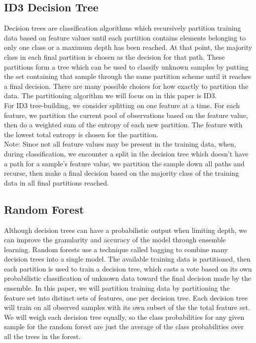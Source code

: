 \documentclass{amsart}
\theoremstyle{definition}
\theoremstyle{remark}
\numberwithin{equation}{section}
\begin{document}
\subsection{ID3 Decision Tree}
Decision trees are classification algorithms which recursively partition training data based on feature values until each partition contains elements belonging to only one class or a maximum depth has been reached. At that point, the majority class in each final partition is chosen as the decision for that path. These partitions form a tree which can be used to classify unknown samples by putting the set containing that sample through the same partition scheme until it reaches a final decision. There are many possible choices for how exactly to partition the data. The partitioning algorithm we will focus on in this paper is ID3.\\
For ID3 tree-building, we consider splitting on one feature at a time. For each feature, we partition the current pool of observations based on the feature value, then do a weighted sum of the entropy of each new partition. The feature with the lowest total entropy is chosen for the partition.\\
Note: Since not all feature values may be present in the training data, when, during classification, we encounter a split in the decision tree which doesn't have a path for a sample's feature value, we partition the sample down all paths and recurse, then make a final decision based on the majority class of the training data in all final partitions reached.\\
\subsection{Random Forest}
Although decision trees can have a probabilistic output when limiting depth, we can improve the granularity and accuracy of the model through ensemble learning. Random forests use a technique called bagging to combine many decision trees into a single model. The available training data is partitioned, then each partition is used to train a decision tree, which casts a vote based on its own probabilistic classification of unknown data toward the final decision made by the ensemble. In this paper, we will partition training data by partitioning the feature set into distinct sets of features, one per decision tree. Each decision tree will train on all observed samples with its own subset of the the total feature set. We will weigh each decision tree equally, so the class probabilities for any given sample for the random forest are just the average of the class probabilities over all the trees in the forest.\\
\end{document}

